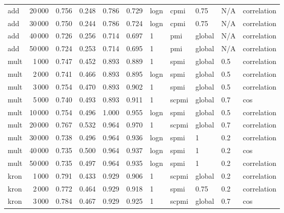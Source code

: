 \begin{tabular}{lrrrrrlllll}
     add &           20\,000 &  0.756 &  0.248 &      0.786 &          0.729 &  logn &   cpmi &    0.75 &  N/A &    correlation \\
     add &           30\,000 &  0.750 &  0.244 &      0.786 &          0.724 &  logn &   cpmi &    0.75 &  N/A &    correlation \\
     add &           40\,000 &  0.726 &  0.256 &      0.714 &          0.697 &     1 &    pmi &  global &  N/A &    correlation \\
     add &           50\,000 &  0.724 &  0.253 &      0.714 &          0.695 &     1 &    pmi &  global &  N/A &    correlation \\
    mult &            1\,000 &  0.747 &  0.452 &      0.893 &          0.889 &     1 &   spmi &  global &  0.5 &    correlation \\
    mult &            2\,000 &  0.741 &  0.466 &      0.893 &          0.895 &  logn &   spmi &  global &  0.5 &    correlation \\
    mult &            3\,000 &  0.754 &  0.470 &      0.893 &          0.902 &     1 &   spmi &  global &  0.5 &    correlation \\
    mult &            5\,000 &  0.740 &  0.493 &      0.893 &          0.911 &     1 &  scpmi &  global &  0.7 &            cos \\
    mult &           10\,000 &  0.754 &  0.496 &      1.000 &          0.955 &  logn &   spmi &  global &  0.5 &    correlation \\
    mult &           20\,000 &  0.767 &  0.532 &      0.964 &          0.970 &     1 &  scpmi &  global &  0.7 &    correlation \\
    mult &           30\,000 &  0.738 &  0.496 &      0.964 &          0.936 &  logn &   spmi &       1 &  0.2 &    correlation \\
    mult &           40\,000 &  0.735 &  0.500 &      0.964 &          0.937 &  logn &   spmi &       1 &  0.2 &            cos \\
    mult &           50\,000 &  0.735 &  0.497 &      0.964 &          0.935 &  logn &   spmi &       1 &  0.2 &    correlation \\
    kron &            1\,000 &  0.791 &  0.433 &      0.929 &          0.906 &     1 &  scpmi &  global &  0.2 &    correlation \\
    kron &            2\,000 &  0.772 &  0.464 &      0.929 &          0.918 &     1 &   spmi &    0.75 &  0.2 &    correlation \\
    kron &            3\,000 &  0.784 &  0.467 &      0.929 &          0.925 &     1 &  scpmi &  global &  0.7 &            cos \\

\end{tabular}
